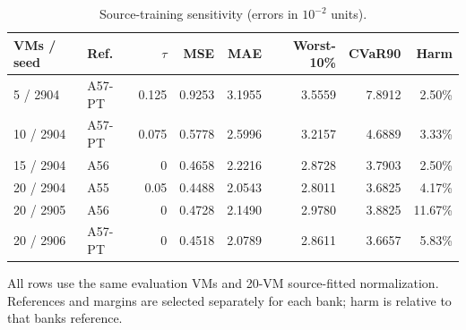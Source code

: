 \begin{table}[pos=!htbp]
\centering\footnotesize
\caption{Source-training sensitivity (errors in $10^{-2}$ units).}\label{tab:s-source}
\begin{tabular}{llrrrrrr}
\toprule
VMs / seed & Ref. & $\tau$ & MSE & MAE & Worst-10\% & CVaR90 & Harm\\\midrule
5 / 2904 & A57-PT & 0.125 & 0.9253 & 3.1955 & 3.5559 & 7.8912 & 2.50\%\\
10 / 2904 & A57-PT & 0.075 & 0.5778 & 2.5996 & 3.2157 & 4.6889 & 3.33\%\\
15 / 2904 & A56 & 0 & 0.4658 & 2.2216 & 2.8728 & 3.7903 & 2.50\%\\
20 / 2904 & A55 & 0.05 & 0.4488 & 2.0543 & 2.8011 & 3.6825 & 4.17\%\\
20 / 2905 & A56 & 0 & 0.4728 & 2.1490 & 2.9780 & 3.8825 & 11.67\%\\
20 / 2906 & A57-PT & 0 & 0.4518 & 2.0789 & 2.8611 & 3.6657 & 5.83\%\\
\bottomrule
\end{tabular}
\par\vspace{3pt}\begin{minipage}{\linewidth}\footnotesize All rows use the same evaluation VMs and 20-VM source-fitted normalization. References and margins are selected separately for each bank; harm is relative to that bank\textquotesingle s reference.\end{minipage}
\end{table}
